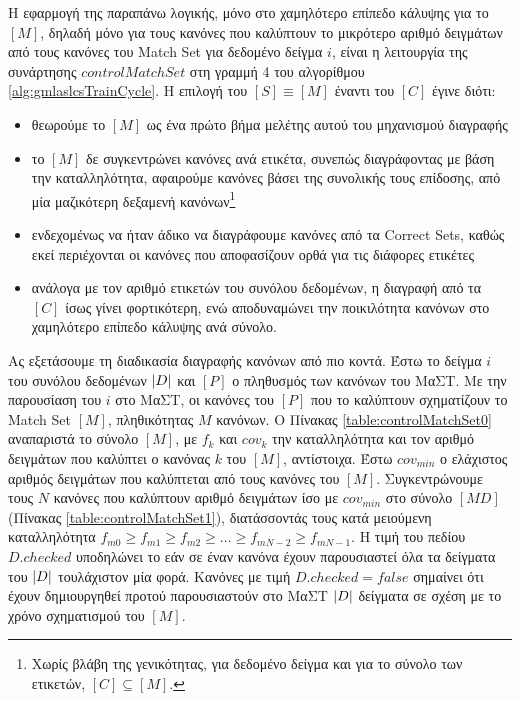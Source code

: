 Η εφαρμογή της παραπάνω λογικής, μόνο στο χαμηλότερο επίπεδο κάλυψης για το $[M]$, δηλαδή μόνο για τους κανόνες που καλύπτουν το μικρότερο αριθμό δειγμάτων από τους κανόνες του Match Set για δεδομένο δείγμα $i$, είναι η λειτουργία της συνάρτησης $controlMatchSet$ στη γραμμή 4 του αλγορίθμου \ref{alg:gmlaslcsTrainCycle}. Η επιλογή του $[S] \equiv [M]$ έναντι του $[C]$ έγινε διότι:
\begin{itemize}
\item θεωρούμε το $[M]$ ως ένα πρώτο βήμα μελέτης αυτού του μηχανισμού διαγραφής
\item το $[M]$ δε συγκεντρώνει κανόνες ανά ετικέτα, συνεπώς διαγράφοντας με βάση την καταλληλότητα, αφαιρούμε κανόνες βάσει της συνολικής τους επίδοσης, από μία μαζικότερη δεξαμενή κανόνων\footnote{Χωρίς βλάβη της γενικότητας, για δεδομένο δείγμα και για το σύνολο των ετικετών, $[C] \subseteq [M]$.}
\item ενδεχομένως να ήταν άδικο να διαγράφουμε κανόνες από τα Correct Sets, καθώς εκεί περιέχονται οι κανόνες που αποφασίζουν ορθά για τις διάφορες ετικέτες
\item ανάλογα με τον αριθμό ετικετών του συνόλου δεδομένων, η διαγραφή από τα $[C]$ ίσως γίνει φορτικότερη, ενώ αποδυναμώνει την ποικιλότητα κανόνων στο χαμηλότερο επίπεδο κάλυψης ανά σύνολο.
\end{itemize}



Ας εξετάσουμε τη διαδικασία διαγραφής κανόνων από πιο κοντά. Έστω το δείγμα $i$ του συνόλου δεδομένων $\lvert D\rvert$ και $[P]$ ο πληθυσμός των κανόνων του ΜαΣΤ. Με την παρουσίαση του $i$ στο ΜαΣΤ, οι κανόνες του $[P]$ που το καλύπτουν σχηματίζουν το Match Set $[M]$, πληθικότητας $M$ κανόνων. Ο Πίνακας \ref{table:controlMatchSet0} αναπαριστά το σύνολο $[M]$, με $f_{k}$ και $cov_{k}$ την καταλληλότητα και τον αριθμό δειγμάτων που καλύπτει ο κανόνας $k$ του $[M]$, αντίστοιχα. Έστω $cov_{min}$ ο ελάχιστος αριθμός δειγμάτων που καλύπτεται από τους κανόνες του $[M]$. Συγκεντρώνουμε τους $N$ κανόνες που καλύπτουν αριθμό δειγμάτων ίσο με $cov_{min}$ στο σύνολο $[MD]$ (Πίνακας \ref{table:controlMatchSet1}), διατάσσοντάς τους κατά μειούμενη καταλληλότητα $f_{m0} \geq f_{m1} \geq f_{m2} \geq \ldots \geq f_{mN-2} \geq f_{mN-1}$. Η τιμή του πεδίου $D.checked$ υποδηλώνει το εάν σε έναν κανόνα έχουν παρουσιαστεί όλα τα δείγματα του $\lvert D\rvert$ τουλάχιστον μία φορά. Κανόνες με τιμή $D.checked=false$ σημαίνει ότι έχουν δημιουργηθεί προτού παρουσιαστούν στο ΜαΣΤ $\lvert D\rvert$ δείγματα σε σχέση με το χρόνο σχηματισμού του $[M]$. 




